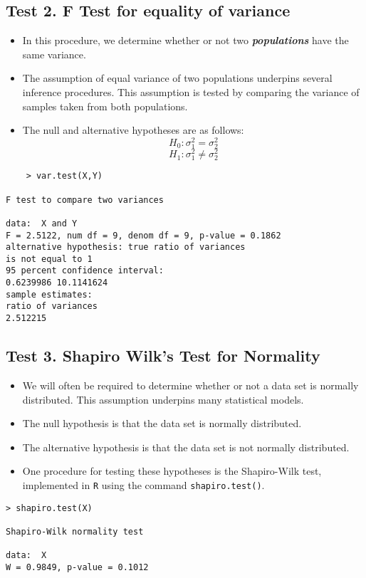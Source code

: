 
\subsection*{Test 2. F Test for equality of variance}
\begin{itemize}
	
\item In this procedure, we determine whether or not two \textit{\textbf{populations}} have the same variance.
	
\item The assumption of equal variance of two populations underpins several inference procedures. This assumption is tested by comparing the variance of samples taken from both populations.
	
\item The null and alternative hypotheses are as follows:
	\[ H_0: \sigma^2_1 = \sigma^2_2 \]
	\[ H_1: \sigma^2_1 \neq \sigma^2_2 \]
\end{itemize}
\begin{framed}
	\begin{verbatim}
	> var.test(X,Y)
	
F test to compare two variances

data:  X and Y
F = 2.5122, num df = 9, denom df = 9, p-value = 0.1862
alternative hypothesis: true ratio of variances
is not equal to 1
95 percent confidence interval:
0.6239986 10.1141624
sample estimates:
ratio of variances 
2.512215 
\end{verbatim}
\end{framed}

\subsection*{Test 3. Shapiro Wilk's Test for Normality}
\begin{itemize}

\item We will often be required to determine whether or not a data set is normally distributed.
This assumption underpins many statistical models.

\item The null hypothesis is that the data set is normally distributed.

\item The alternative hypothesis is that the data set is not normally distributed.

\item One procedure for testing these hypotheses is the Shapiro-Wilk test, implemented in \texttt{R} using the command \texttt{shapiro.test()}.
\end{itemize}
\begin{framed}
\begin{verbatim}
> shapiro.test(X)

Shapiro-Wilk normality test

data:  X
W = 0.9849, p-value = 0.1012


\end{verbatim}
\end{framed}

